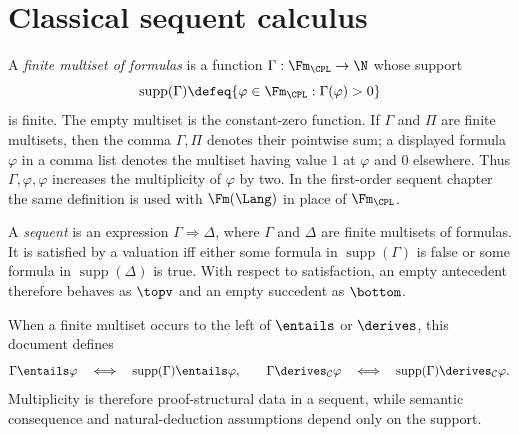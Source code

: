 \section{Classical sequent calculus}
\label{sec:prop-deduction-02}

\begin{definition}[Sequent]
A \emph{finite multiset of formulas} is a function
\(\Gamma:\Fm_{\CPL}\to\N\) whose support
\[
 \operatorname{supp}(\Gamma)
 \defeq\{\varphi\in\Fm_{\CPL}:\Gamma(\varphi)>0\}
\]
is finite.  The empty multiset is the constant-zero function.  If
\(\Gamma\) and \(\Pi\) are finite multisets, then the comma
\(\Gamma,\Pi\) denotes their pointwise sum; a displayed formula \(\varphi\)
in a comma list denotes the multiset having value \(1\) at \(\varphi\) and
\(0\) elsewhere.  Thus \(\Gamma,\varphi,\varphi\) increases the multiplicity
of \(\varphi\) by two.  In the first-order sequent chapter the same definition
is used with \(\Fm(\Lang)\) in place of \(\Fm_{\CPL}\).

A \emph{sequent} is an expression \(\Gamma\Rightarrow\Delta\), where
\(\Gamma\) and \(\Delta\) are finite multisets of formulas.  It is satisfied
by a valuation iff either some formula in \(\operatorname{supp}(\Gamma)\) is
false or some formula in \(\operatorname{supp}(\Delta)\) is true.  With
respect to satisfaction, an empty antecedent therefore behaves as
\(\topv\) and an empty succedent as \(\bottom\).

When a finite multiset occurs to the left of \(\entails\) or \(\derives\),
this document defines
\[
 \Gamma\entails\varphi
 \quad\Longleftrightarrow\quad
 \operatorname{supp}(\Gamma)\entails\varphi,
 \qquad
 \Gamma\derives_{\mathcal C}\varphi
 \quad\Longleftrightarrow\quad
 \operatorname{supp}(\Gamma)\derives_{\mathcal C}\varphi.
\]
Multiplicity is therefore proof-structural data in a sequent, while semantic
consequence and natural-deduction assumptions depend only on the support.
\end{definition}

